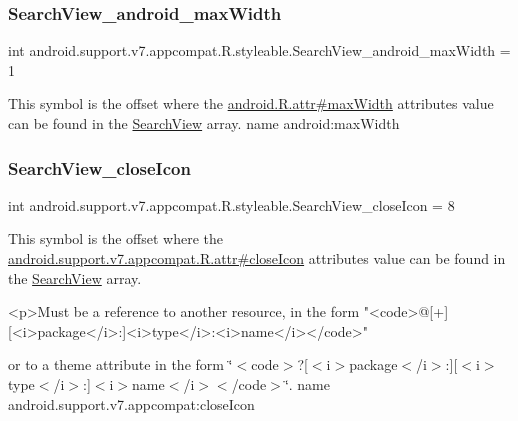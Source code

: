 \subsubsection{\texorpdfstring{Search\+View\+\_\+android\+\_\+max\+Width}{SearchView\_android\_maxWidth}}
{\footnotesize\ttfamily int android.\+support.\+v7.\+appcompat.\+R.\+styleable.\+Search\+View\+\_\+android\+\_\+max\+Width = 1\hspace{0.3cm}{\ttfamily [static]}}

This symbol is the offset where the \hyperlink{}{android.\+R.\+attr\#max\+Width} attribute\textquotesingle{}s value can be found in the \hyperlink{classandroid_1_1support_1_1v7_1_1appcompat_1_1R_1_1styleable_a01af09df9e38f1e4f57165c3d3cee9fe}{Search\+View} array.  name android\+:max\+Width \mbox{\label{classandroid_1_1support_1_1v7_1_1appcompat_1_1R_1_1styleable_a7325792da95c39bc84bbe457b170676d}} 
\subsubsection{\texorpdfstring{Search\+View\+\_\+close\+Icon}{SearchView\_closeIcon}}
{\footnotesize\ttfamily int android.\+support.\+v7.\+appcompat.\+R.\+styleable.\+Search\+View\+\_\+close\+Icon = 8\hspace{0.3cm}{\ttfamily [static]}}

This symbol is the offset where the \hyperlink{classandroid_1_1support_1_1v7_1_1appcompat_1_1R_1_1attr_a37078ec84b7d7129c2ee45c4a2639dc7}{android.\+support.\+v7.\+appcompat.\+R.\+attr\#close\+Icon} attribute\textquotesingle{}s value can be found in the \hyperlink{classandroid_1_1support_1_1v7_1_1appcompat_1_1R_1_1styleable_a01af09df9e38f1e4f57165c3d3cee9fe}{Search\+View} array.

\begin{DoxyVerb}      <p>Must be a reference to another resource, in the form "<code>@[+][<i>package</i>:]<i>type</i>:<i>name</i></code>"
\end{DoxyVerb}
 or to a theme attribute in the form \char`\"{}$<$code$>$?\mbox{[}$<$i$>$package$<$/i$>$\+:\mbox{]}\mbox{[}$<$i$>$type$<$/i$>$\+:\mbox{]}$<$i$>$name$<$/i$>$$<$/code$>$\char`\"{}.  name android.\+support.\+v7.\+appcompat\+:close\+Icon \mbox{\label{classandroid_1_1support_1_1v7_1_1appcompat_1_1R_1_1styleable_afb59632753076895715c52a281d2ee4e}} 
